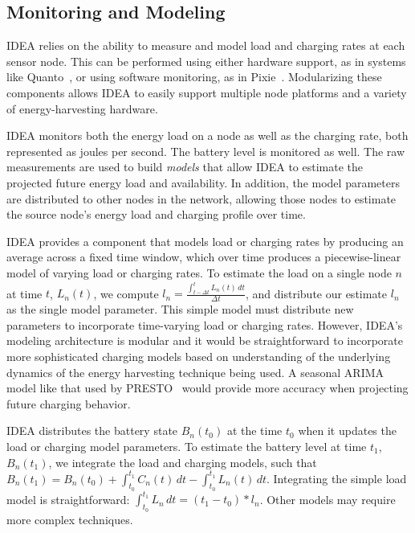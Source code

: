 \subsection{Monitoring and Modeling}

IDEA relies on the ability to measure and model load and charging rates at
each sensor node. This can be performed using either hardware support, as in
systems like Quanto~\cite{quanto-osdi08}, or using software monitoring, as in
Pixie~\cite{pixie-sensys08}.  Modularizing these components allows IDEA to
easily support multiple node platforms and a variety of energy-harvesting
hardware.

IDEA monitors both the energy load on a node as well as the charging rate,
both represented as joules per second. The battery level is monitored as
well. The raw measurements are used to build \textit{models} that allow IDEA
to estimate the projected future energy load and availability. In addition,
the model parameters are distributed to other nodes in the network, allowing
those nodes to estimate the source node's energy load and charging profile
over time.

IDEA provides a component that models load or charging rates by producing an
average across a fixed time window, which over time produces a
piecewise-linear model of varying load or charging rates. To estimate the
load on a single node $n$ at time $t$, $L_n(t)$, we compute $l_n =
\frac{\int_{t - \Delta t}^t \! L_n(t)\, dt}{\Delta t}$, and distribute our
estimate $l_n$ as the single model parameter. This simple model must
distribute new parameters to incorporate time-varying load or charging rates.
However, IDEA's modeling architecture is modular and it would be
straightforward to incorporate more sophisticated charging models based on
understanding of the underlying dynamics of the energy harvesting technique
being used. A seasonal ARIMA model like that used by PRESTO~\cite{presto-TON}
would provide more accuracy when projecting future charging behavior.

IDEA distributes the battery state $B_n(t_0)$ at the time $t_0$ when it
updates the load or charging model parameters. To estimate the battery level
at time $t_1$, $B_n(t_1)$, we integrate the load and charging models, such
that $B_n(t_1) = B_n(t_0) + \int_{t_0}^{t_1} \! C_n(t) \, dt -
\int_{t_0}^{t_1} \! L_n(t) \, dt$. Integrating the simple load model is
straightforward: $\int_{t_0}^{t_1} \! L_n \, dt = \left( t_1 - t_0 \right) *
l_n$. Other models may require more complex techniques.

